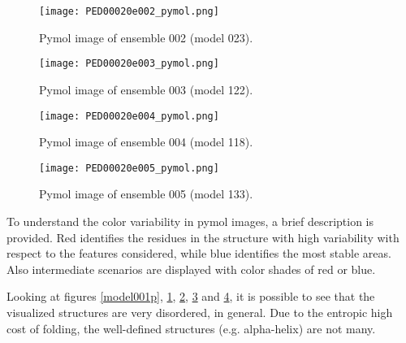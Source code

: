 \begin{figure}[H]
    \centering
		\texttt{[image: PED00020e002\_pymol.png]}
		\caption{Pymol image of ensemble 002 (model 023).}
		\label{model002p}
\end{figure}

\begin{figure}[H]
    \centering
		\texttt{[image: PED00020e003\_pymol.png]}
		\caption{Pymol image of ensemble 003 (model 122).}
		\label{model003p}
\end{figure}

\begin{figure}[H]
    \centering
		\texttt{[image: PED00020e004\_pymol.png]}
		\caption{Pymol image of ensemble 004 (model 118).}
		\label{model004p}
\end{figure}

\begin{figure}[H]
    \centering
		\texttt{[image: PED00020e005\_pymol.png]}
		\caption{Pymol image of ensemble 005 (model 133).}
		\label{model005p}
\end{figure}


\medskip
\medskip
To understand the color variability in pymol images, a brief description is provided. Red identifies the residues in the structure with high variability with respect to the features considered, while blue identifies the most stable areas. Also intermediate scenarios are displayed with color shades of red or blue.  

\medskip
Looking at figures \ref{model001p}, \ref{model002p}, \ref{model003p}, \ref{model004p} and \ref{model005p}, it is possible to see that the visualized structures are very disordered, in general. Due to the entropic high cost of folding, the well-defined structures (e.g. alpha-helix) are not many. %
